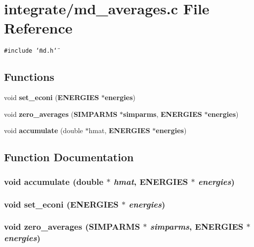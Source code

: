 \section{integrate/md\_\-averages.c File Reference}
\label{md__averages_8c}
{\tt \#include \char`\"{}md.h\char`\"{}}\par
\subsection*{Functions}
\begin{CompactItemize}
\item 
void {\bf set\_\-econi} ({\bf ENERGIES} $\ast${\bf energies})
\item 
void {\bf zero\_\-averages} ({\bf SIMPARMS} $\ast${\bf simparms}, {\bf ENERGIES} $\ast${\bf energies})
\item 
void {\bf accumulate} (double $\ast$hmat, {\bf ENERGIES} $\ast${\bf energies})
\end{CompactItemize}


\subsection{Function Documentation}
\subsubsection{\setlength{\rightskip}{0pt plus 5cm}void accumulate (double $\ast$ {\em hmat}, {\bf ENERGIES} $\ast$ {\em energies})}\label{md__averages_8c_06696ee341353d6d9d78f25d5d6a2648}


\subsubsection{\setlength{\rightskip}{0pt plus 5cm}void set\_\-econi ({\bf ENERGIES} $\ast$ {\em energies})}\label{md__averages_8c_e24f65d8d6ad70fc67ab4f9ae3d9faf9}


\subsubsection{\setlength{\rightskip}{0pt plus 5cm}void zero\_\-averages ({\bf SIMPARMS} $\ast$ {\em simparms}, {\bf ENERGIES} $\ast$ {\em energies})}\label{md__averages_8c_804990f7e30f1fe9df0712b64c9cf1b7}


